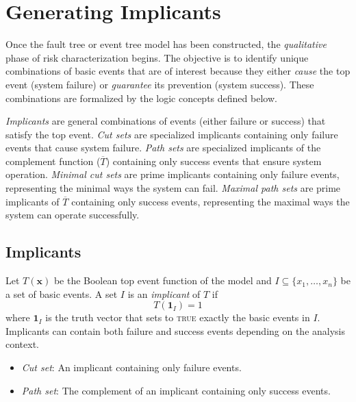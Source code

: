 \section{Generating Implicants}


Once the fault tree or event tree model has been constructed, the \emph{qualitative} phase of risk characterization begins. The objective is to identify unique combinations of basic events that are of interest because they either \emph{cause} the top event (system failure) or \emph{guarantee} its prevention (system success). These combinations are formalized by the logic concepts defined below.

\emph{Implicants} are general combinations of events (either failure or success) that satisfy the top event. \emph{Cut sets} are specialized implicants containing only failure events that cause system failure. \emph{Path sets} are specialized implicants of the complement function ($\overline{T}$) containing only success events that ensure system operation. \emph{Minimal cut sets} are prime implicants containing only failure events, representing the minimal ways the system can fail. \emph{Maximal path sets} are prime implicants of $\overline{T}$ containing only success events, representing the maximal ways the system can operate successfully. 

\subsection{Implicants}
Let $T(\mathbf{x})$ be the Boolean top event function of the model and $I \subseteq \{x_1, \dots, x_n\}$ be a set of basic events. A set $I$ is an \emph{implicant} of $T$ if
\[
T(\mathbf{1}_I) = 1
\]
where $\mathbf{1}_I$ is the truth vector that sets to \textsc{true} exactly the basic events in $I$. Implicants can contain both failure and success events depending on the analysis context.

\begin{itemize}
  \item \emph{Cut set}: An implicant containing only failure events.
  \item \emph{Path set}: The complement of an implicant containing only success events.
\end{itemize}

